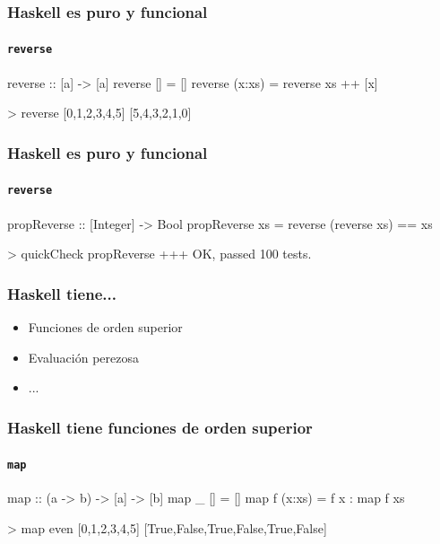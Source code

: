 \documentclass[spanish]{beamer}
\begin{document}


\begin{frame}[fragile]
  \frametitle{Haskell es puro y funcional}
  \framesubtitle{\texttt{reverse}}

  \begin{code}
reverse :: [a] -> [a]
reverse []     = []
reverse (x:xs) = reverse xs ++ [x]
  \end{code}

  \begin{code}
> reverse [0,1,2,3,4,5]
[5,4,3,2,1,0]
  \end{code}
\end{frame}


\begin{frame}[fragile]
  \frametitle{Haskell es puro y funcional}
  \framesubtitle{\texttt{reverse}}

  \begin{code}
propReverse :: [Integer] -> Bool
propReverse xs = reverse (reverse xs) == xs
  \end{code}

  \begin{code}
> quickCheck propReverse
+++ OK, passed 100 tests.
  \end{code}
\end{frame}


\begin{frame}
  \frametitle{Haskell tiene...}

  \begin{itemize}
  \item
    Funciones de orden superior
  \item
    Evaluación perezosa
  \item
    ...
  \end{itemize}
\end{frame}


\begin{frame}[fragile]
  \frametitle{Haskell tiene funciones de orden superior}
  \framesubtitle{\texttt{map}}

  \begin{code}
map :: (a -> b) -> [a] -> [b]
map _ []     = []
map f (x:xs) = f x : map f xs
  \end{code}

  \begin{code}
> map even [0,1,2,3,4,5]
[True,False,True,False,True,False]
  \end{code}
\end{frame}
\end{document}
